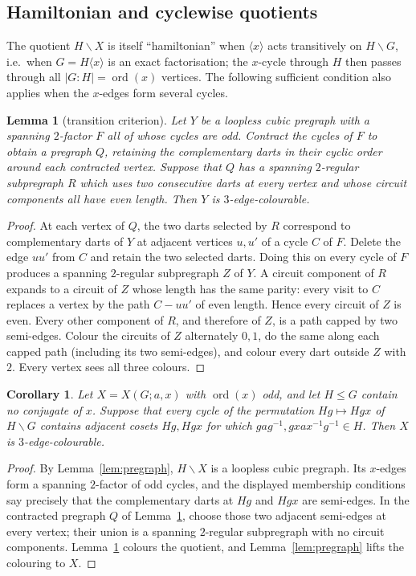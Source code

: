 \documentclass[11pt,a4paper]{article}
\newtheorem{lemma}[theorem]{Lemma}
\newtheorem{corollary}[theorem]{Corollary}
\theoremstyle{definition}
\theoremstyle{remark}
\newcommand{\ord}{\operatorname{ord}}
\newcommand{\X}[3]{X(#1;#2,#3)}
\begin{document}
\subsection{Hamiltonian and cyclewise quotients}\label{sec:hamquot}
The quotient $H\backslash X$ is itself ``hamiltonian'' when $\langle x\rangle$ acts transitively on $H\backslash G$, i.e.\ when $G=H\langle x\rangle$ is an exact factorisation; the $x$-cycle through $H$ then passes through all $|G:H|=\ord(x)$ vertices.  The following sufficient condition also applies when the $x$-edges form several cycles.

\begin{lemma}[transition criterion]\label{lem:hampregraph}
Let $Y$ be a loopless cubic pregraph with a spanning $2$-factor $F$ all of whose cycles are odd.  Contract the cycles of $F$ to obtain a pregraph $Q$, retaining the complementary darts in their cyclic order around each contracted vertex.  Suppose that $Q$ has a spanning $2$-regular subpregraph $R$ which uses two consecutive darts at every vertex and whose circuit components all have even length.  Then $Y$ is $3$-edge-colourable.
\end{lemma}
\begin{proof}
At each vertex of $Q$, the two darts selected by $R$ correspond to complementary darts of $Y$ at adjacent vertices $u,u'$ of a cycle $C$ of $F$.  Delete the edge $uu'$ from $C$ and retain the two selected darts.  Doing this on every cycle of $F$ produces a spanning $2$-regular subpregraph $Z$ of $Y$.  A circuit component of $R$ expands to a circuit of $Z$ whose length has the same parity: every visit to $C$ replaces a vertex by the path $C-uu'$ of even length.  Hence every circuit of $Z$ is even.  Every other component of $R$, and therefore of $Z$, is a path capped by two semi-edges.  Colour the circuits of $Z$ alternately $0,1$, do the same along each capped path (including its two semi-edges), and colour every dart outside $Z$ with $2$.  Every vertex sees all three colours.
\end{proof}

\begin{corollary}\label{cor:cyclewise-quotient}
Let $X=\X{G}{a}{x}$ with $\ord(x)$ odd, and let $H\le G$ contain no conjugate of $x$.  Suppose that every cycle of the permutation $Hg\mapsto Hgx$ of $H\backslash G$ contains adjacent cosets $Hg,Hgx$ for which $gag^{-1},gxax^{-1}g^{-1}\in H$.  Then $X$ is $3$-edge-colourable.
\end{corollary}
\begin{proof}
By Lemma~\ref{lem:pregraph}, $H\backslash X$ is a loopless cubic pregraph.  Its $x$-edges form a spanning $2$-factor of odd cycles, and the displayed membership conditions say precisely that the complementary darts at $Hg$ and $Hgx$ are semi-edges.  In the contracted pregraph $Q$ of Lemma~\ref{lem:hampregraph}, choose those two adjacent semi-edges at every vertex; their union is a spanning $2$-regular subpregraph with no circuit components.  Lemma~\ref{lem:hampregraph} colours the quotient, and Lemma~\ref{lem:pregraph} lifts the colouring to $X$.
\end{proof}
\end{document}
